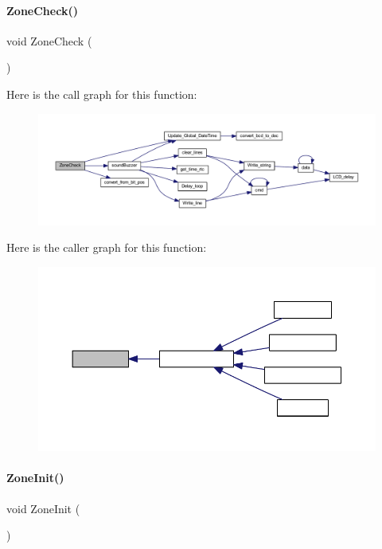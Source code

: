 \paragraph{Zone\+Check()}
{\footnotesize\ttfamily void Zone\+Check (\begin{DoxyParamCaption}{ }\end{DoxyParamCaption})}

Here is the call graph for this function\+:
\nopagebreak
\begin{figure}[H]
\begin{center}
\leavevmode
\includegraphics[width=350pt]{a00062_aefe3a1f3ce1ce2aef86b493a3331bf2e_cgraph}
\end{center}
\end{figure}
Here is the caller graph for this function\+:
\nopagebreak
\begin{figure}[H]
\begin{center}
\leavevmode
\includegraphics[width=350pt]{a00062_aefe3a1f3ce1ce2aef86b493a3331bf2e_icgraph}
\end{center}
\end{figure}
\mbox{\label{a00062_aad1cb50e4ddc412138066d4c3b4d9529}} 
\paragraph{Zone\+Init()}
{\footnotesize\ttfamily void Zone\+Init (\begin{DoxyParamCaption}{ }\end{DoxyParamCaption})}

